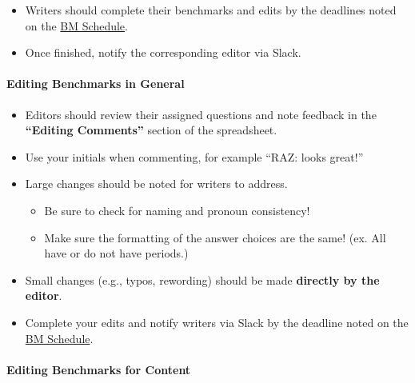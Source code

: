 \documentclass[
]{article}
\providecommand{\tightlist}{%
  \setlength{\itemsep}{0pt}\setlength{\parskip}{0pt}}
\begin{document}
\begin{itemize}
\tightlist
\item
  Writers should complete their benchmarks and edits by the deadlines noted on the \href{https://docs.google.com/spreadsheets/d/1hingHbcfSHpUr1Km8NF4nnrDgw5ivD6b/edit?gid=602524248\#gid=602524248}{BM Schedule}.\\
\item
  Once finished, notify the corresponding editor via Slack.
\end{itemize}

\hypertarget{editing-benchmarks-in-general}{%
\paragraph{Editing Benchmarks in General}\label{editing-benchmarks-in-general}}

\begin{itemize}
\tightlist
\item
  Editors should review their assigned questions and note feedback in the \textbf{``Editing Comments''} section of the spreadsheet.\\
\item
  Use your initials when commenting, for example ``RAZ: looks great!''
\item
  Large changes should be noted for writers to address.

  \begin{itemize}
  \tightlist
  \item
    Be sure to check for naming and pronoun consistency!\\
  \item
    Make sure the formatting of the answer choices are the same! (ex. All have or do not have periods.)
  \end{itemize}
\item
  Small changes (e.g., typos, rewording) should be made \textbf{directly by the editor}.\\
\item
  Complete your edits and notify writers via Slack by the deadline noted on the \href{https://docs.google.com/spreadsheets/d/1hingHbcfSHpUr1Km8NF4nnrDgw5ivD6b/edit?gid=602524248\#gid=602524248}{BM Schedule}.
\end{itemize}

\hypertarget{editing-benchmarks-for-content}{%
\paragraph{Editing Benchmarks for Content}\label{editing-benchmarks-for-content}}
\end{document}
